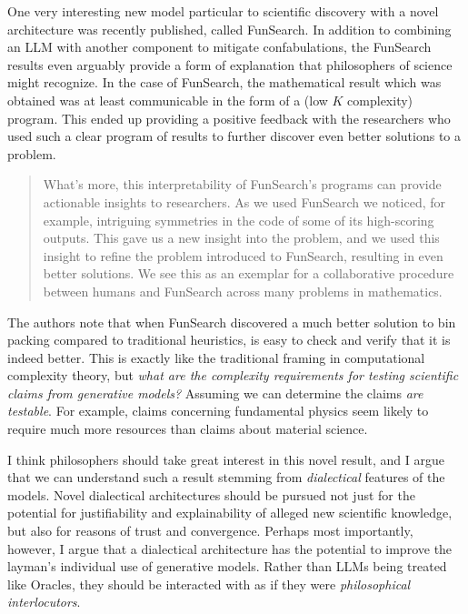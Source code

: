 \documentclass[11pt, oneside]{article}   	%
\begin{document}
One very interesting new model particular to scientific discovery with a novel architecture was recently published, called FunSearch.  \citep{FunSearch2024}  In addition to combining an LLM with another component to mitigate confabulations, the FunSearch results even arguably provide a form of explanation that philosophers of science might recognize.  In the case of FunSearch, the mathematical result which was obtained was at least communicable in the form of a (low $K$ complexity) program. This ended up providing a positive feedback with the researchers who used such a clear program of results to further discover even better solutions to a problem. 


\begin{quote}
    What’s more, this interpretability of FunSearch’s programs can provide actionable insights to researchers. As we used FunSearch we noticed, for example, intriguing symmetries in the code of some of its high-scoring outputs. This gave us a new insight into the problem, and we used this insight to refine the problem introduced to FunSearch, resulting in even better solutions. We see this as an exemplar for a collaborative procedure between humans and FunSearch across many problems in mathematics.

    \citep{FunSearch2024}
\end{quote}


The authors note that when FunSearch discovered a much better solution to bin packing compared to traditional heuristics, is easy to check and verify that it is indeed better.  This is exactly like the traditional framing in computational complexity theory, but \emph{what are the complexity requirements for testing scientific claims from generative models?}  Assuming we can determine the claims \emph{are testable}.  For example, claims concerning fundamental physics seem likely to require much more resources than claims about material science.

I think philosophers should take great interest in this novel result, and I argue that we can understand such a result stemming from \emph{dialectical} features of the models.  Novel dialectical architectures should be pursued not just for the potential for justifiability and explainability of alleged new scientific knowledge, but also for reasons of trust and convergence.  Perhaps most importantly, however, I argue that a dialectical architecture has the potential to improve the layman's individual use of generative models.  Rather than LLMs being treated like Oracles, they should be interacted with as if they were \emph{philosophical interlocutors}.
\end{document}
